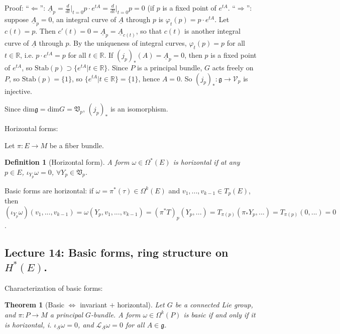 \documentclass{article}
\theoremstyle{mystyle}
\newtheorem*{definition}{Definition}%
\newtheorem*{theorem*}{Theorem}
\theoremstyle{remark}
\numberwithin{equation}{section}
\begin{document}
Proof: ``$\Leftarrow$'': $\underline{A}_p = \frac{d}{dt}\big|_{t=0} p\cdot e^{tA} = \frac{d}{dt}\big|_{t=0}p = 0$ (if $p$ is a fixed point of $e^{tA}$. ``$\Rightarrow$'': suppose $\underline{A}_p=0$, an integral curve of $\underline{A}$ through $p$ is $\varphi_t(p) = p\cdot e^{tA}$. Let $c(t) =p$. Then $c'(t)=0 = \underline{A}_p = \underline{A}_{c(t)}$, so that $c(t)$ is another integral curve of $\underline{A}$ through $p$. By the uniqueness of integral curves, $\varphi_t(p)=p$ for all $t\in \mathbb{R}$, i.e. $p\cdot e^{tA} = p$ for all $t\in \mathbb{R}$. If $(j_p)_*(A) = \underline{A}_p = 0$, then $p$ is a fixed point of $e^{tA}$, so $\text{Stab}(p) \supset \{e^{tA}|t\in \mathbb{R}\}$. Since $P$ is a principal bundle, $G$ acts freely on $P$, so $\text{Stab}(p) = \{1\}$, so $\{e^{tA}|t\in \mathbb{R}\} = \{1\}$, hence $A=0$. So $(j_p)_*\colon \mathfrak{g}\rightarrow \mathcal{V}_p$ is injective.

Since $\mathrm{dim}\mathfrak{g} = \mathrm{dim}G = \mathfrak{V}_p$, $(j_p)_*$ is an isomorphism.
 
Horizontal forms:

Let $\pi\colon E\rightarrow M$ be a fiber bundle. 
\begin{definition}[Horizontal form] A form $\omega \in \Omega^*(E)$ is \emph{horizontal} if at any $p\in E$, $\iota_{Y_p}\omega = 0$, $\forall Y_p\in \mathfrak{V}_p$.
\end{definition}

Basic forms are horizontal: if $\omega = \pi^*(\tau) \in \Omega^k(E)$ and $v_1,...,v_{k-1}\in T_p(E)$, then
$(\iota_{Y_p} \omega) (v_1,...,v_{k-1}) = \omega(Y_p,v_1,...,v_{k-1}) = (\pi^*T)_p (Y_p,...) = T_{\pi(p)}(\pi_*Y_p,...) = T_{\pi(p)}(0,...) = 0$. 



\subsection{Lecture 14: Basic forms, ring structure on $H^*(E)$.}


Characterization of basic forms:

\begin{theorem*}[Basic $\Leftrightarrow$ invariant $+$ horizontal] Let $G$ be a connected Lie group, and $\pi\colon P\rightarrow M$ a principal $G$-bundle. A form $\omega \in \Omega^k(P)$ is basic if and only if it is horizontal, i. $\iota_{\underline{A}} \omega =0$, and $\mathcal{L}_{\underline{A}}\omega =0$ for all $A\in \mathfrak{g}$.
\end{theorem*}
\end{document}
